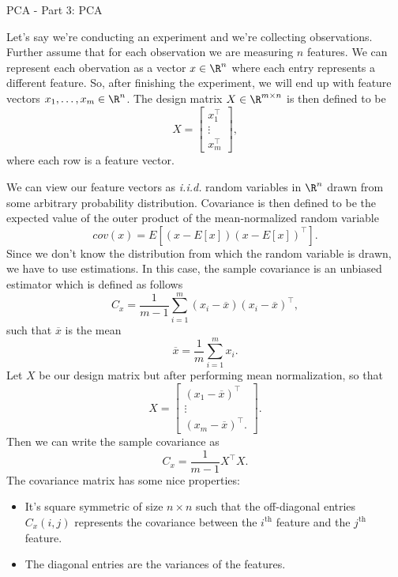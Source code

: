 \pagebreak
\begin{entry}[4]{PCA - Part 3: PCA}

\begin{entrysection}
Let's say we're conducting an experiment and we're collecting observations. Further assume that for each observation we are measuring $n$ features. We can represent each obervation as a vector $x \in \R^n$ where each entry represents a different feature. So, after finishing the experiment, we will end up with feature vectors $x_1,\ldots,x_m \in \R^n$. The design matrix $X \in \R^{m \times n}$ is then defined to be
\[ X = \begin{bmatrix}x_1^{\top} \\ \vdots \\ x_m^{\top} \end{bmatrix} ,\]
where each row is a feature vector.
\end{entrysection}

\begin{entrysection}
We can view our feature vectors as \textit{i.i.d.} random variables in $\R^n$ drawn from some arbitrary probability distribution. Covariance is then defined to be the expected value of the outer product of the mean-normalized random variable
\[ cov(x) = E[ (x - E[x])(x - E[x])^{\top} ]. \]
Since we don't know the distribution from which the random variable is drawn, we have to use estimations. In this case, the sample covariance is an unbiased estimator which is defined as follows
\[ C_x = \frac{1}{m - 1} \sum_{i = 1}^{m}(x_i - \overline{x})(x_i - \overline{x})^{\top}, \]
such that $\overline{x}$ is the mean 
\[\overline{x} = \frac{1}{m} \sum_{i = 1}^{m} x_i.\]
Let $X$ be our design matrix but after performing mean normalization, so that
\[ X = \begin{bmatrix} (x_1 - \overline{x})^{\top} \\ \vdots \\ (x_m - \overline{x})^{\top}. \end{bmatrix}. \]
Then we can write the sample covariance as
\[ C_x = \frac{1}{m - 1} X^{\top} X. \]
The covariance matrix has some nice properties:
\begin{itemize}
    \item It's square symmetric of size $n \times n$ such that the off-diagonal entries $C_x(i, j)$ represents the covariance between the $i^{\text{th}}$ feature and the $j^{\text{th}}$ feature.
    \item The diagonal entries are the variances of the features.
\end{itemize}
\end{entrysection}


\end{entry}
